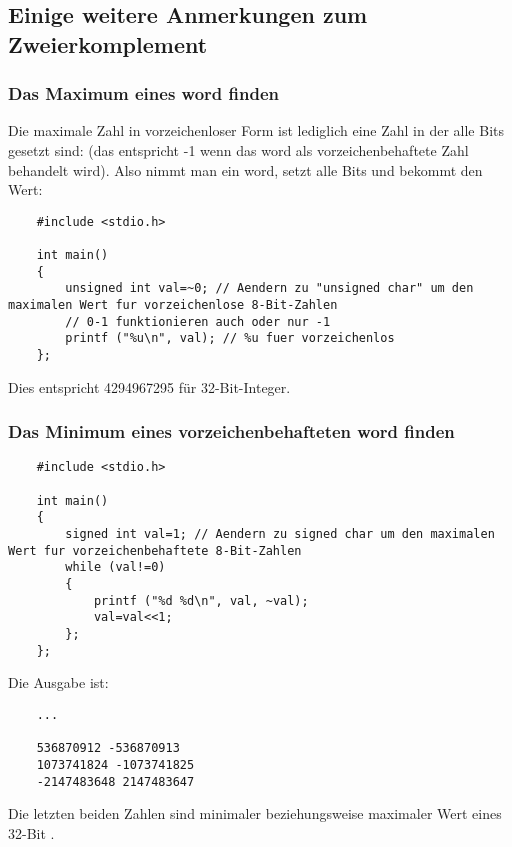 \subsection{Einige weitere Anmerkungen zum Zweierkomplement}

\subsubsection{Das Maximum eines \gls{word} finden}
Die maximale Zahl in vorzeichenloser Form ist lediglich eine Zahl in der alle
Bits gesetzt sind: 
(das entspricht -1 wenn das \gls{word} als vorzeichenbehaftete Zahl behandelt wird).
Also nimmt man ein \gls{word}, setzt alle Bits und bekommt den Wert:

\begin{lstlisting}
	#include <stdio.h>

	int main()
	{
		unsigned int val=~0; // Aendern zu "unsigned char" um den maximalen Wert fur vorzeichenlose 8-Bit-Zahlen
		// 0-1 funktionieren auch oder nur -1
		printf ("%u\n", val); // %u fuer vorzeichenlos
	};
\end{lstlisting}

Dies entspricht 4294967295 für 32-Bit-Integer.

\subsubsection{Das Minimum eines vorzeichenbehafteten \gls{word} finden}



\begin{lstlisting}
	#include <stdio.h>

	int main()
	{
		signed int val=1; // Aendern zu signed char um den maximalen Wert fur vorzeichenbehaftete 8-Bit-Zahlen
		while (val!=0)
		{
			printf ("%d %d\n", val, ~val);
			val=val<<1;
		};
	};
\end{lstlisting}

Die Ausgabe ist:

\begin{lstlisting}
	...

	536870912 -536870913
	1073741824 -1073741825
	-2147483648 2147483647
\end{lstlisting}

Die letzten beiden Zahlen sind minimaler beziehungsweise maximaler Wert eines 32-Bit .
